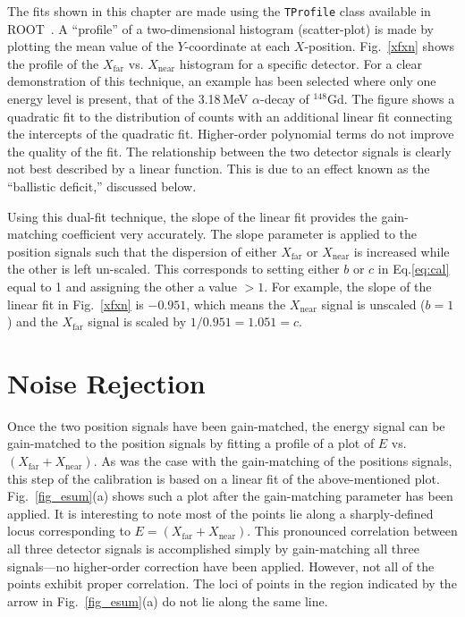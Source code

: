 The fits shown in this chapter are made using the \texttt{TProfile} class available in ROOT~\cite{Brun_1998}.  A ``profile'' of a two-dimensional histogram (scatter-plot) is made by plotting the mean value of the $Y$-co\-or\-di\-nate at each $X$-po\-si\-tion.  Fig.~\ref{xfxn} shows the profile of the $X_\mathrm{far}$ vs. $X_\mathrm{near}$ histogram for a specific detector.  For a clear demonstration of this technique, an example has been selected where only one energy level is present, that of the 3.18\,MeV \label{typo1} $\alpha$-decay of $^{148}$Gd.  The figure shows a quadratic fit to the distribution of counts with an additional linear fit connecting the intercepts of the quadratic fit.  Higher-order polynomial terms do not improve the quality of the fit.  The relationship between the two detector signals is clearly not best described by a linear function.  This is due to an effect known as the ``ballistic deficit,'' discussed below.

Using this dual-fit technique, the slope of the linear fit provides the gain-matching coefficient very accurately.  The slope parameter is applied to the position signals such that the dispersion of either $X_\mathrm{far}$ or $X_\mathrm{near}$ is increased while the other is left un-scaled.  This corresponds to setting either $b$ or $c$ in Eq.\ref{eq:cal} equal to 1 and assigning the other a value $>1$.  For example, the slope of the linear fit in Fig.~\ref{xfxn} is $-0.951$, which means the $X_\mathrm{near}$ signal is unscaled ($b=1$) and the $X_\mathrm{far}$ signal is scaled by $1/0.951=1.051=c$.
 
\section{Noise Rejection}
Once the two position signals have been gain-matched, the energy signal can be gain-matched to the position signals by fitting a profile of a plot of $E$ vs. $(X_\mathrm{far} + X_\mathrm{near})$.  As was the case with the gain-matching of the positions signals, this step of the calibration is based on a linear fit of the above-mentioned plot.  Fig.~\ref{fig_esum}(a) shows such a plot after the gain-matching parameter has been applied.  It is interesting to note most of the points lie along a sharply-defined locus corresponding to $E=(X_\mathrm{far} + X_\mathrm{near})$.  This pronounced correlation between all three detector signals is accomplished simply by gain-matching all three signals---no higher-order correction have been applied.  However, not all of the points exhibit proper correlation.  The loci of points in the region indicated by the arrow in Fig.~\ref{fig_esum}(a) do not lie along the same line.

